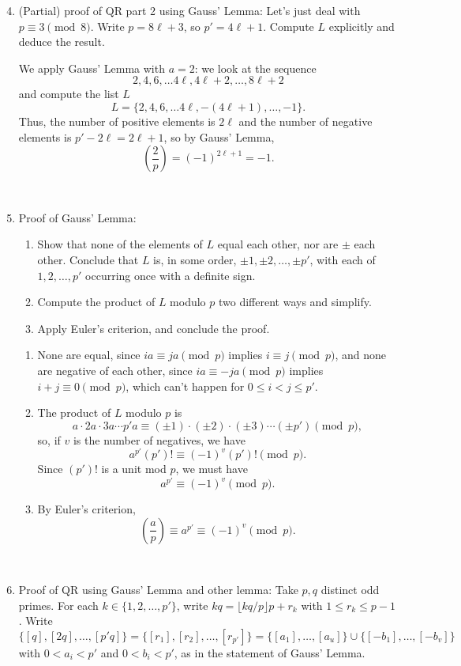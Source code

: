 \documentclass[12pt]{amsart}
\newcommand{\solution}[1]{\ifthenelse {\equal{\displaysol}{1}} {\begin{framed}{\color{meretale}\noindent #1}\end{framed}} { \ }}
\begin{document}
\begin{enumerate}\setcounter{enumi}{3}
\item (Partial) proof of QR part 2 using Gauss' Lemma: Let's just deal with $p\equiv 3 \pmod{8}$. Write $p=8\ell+3$, so $p'=4\ell+1$. Compute $L$ explicitly and deduce the result.

\solution{We apply Gauss' Lemma with $a=2$: we look at the sequence
\[ 2,4,6,\dots 4\ell, 4\ell+2, \dots, 8\ell+2\]
and compute  the list $L$
\[ L= \{2,4,6,\dots 4\ell, -(4\ell +1), \dots, -1\}.\]
Thus, the number of positive elements is $2\ell$ and the number of negative elements is $p' - 2\ell = 2\ell+1$, so by Gauss' Lemma,
\[ \left(\frac{2}{p} \right) = (-1)^{2\ell + 1} = -1.\]}


\item Proof of Gauss' Lemma:
\begin{enumerate}
\item Show that none of the elements of $L$ equal each other, nor are $\pm$ each other. Conclude that $L$ is, in some order, $\pm 1, \pm 2, \dots, \pm p'$, with each of $1,2, \dots, p'$ occurring once with a definite sign.
\item Compute the product of $L$ modulo $p$ two different ways and simplify.
\item Apply Euler's criterion, and conclude the proof.
\end{enumerate}

\solution{
\begin{enumerate}
\item None are equal, since $ia \equiv ja \pmod{p}$ implies $i \equiv j \pmod{p}$, and none are negative of each other, since $ia \equiv -ja \pmod{p}$ implies $i+j \equiv 0 \pmod{p}$, which can't happen for $0\leq i< j \leq p'$.
\item The product of $L$ modulo $p$ is
\[ a \cdot 2a \cdot 3a \cdots p'a \equiv (\pm 1) \cdot (\pm 2) \cdot (\pm 3) \cdots (\pm p') \pmod{p},\]
so, if $v$ is the number of negatives, we have
\[ a^{p'} (p')! \equiv (-1)^v (p')! \pmod{p}.\]
Since $(p')!$ is a unit mod $p$, we must have
\[ a^{p'} \equiv (-1)^v \pmod{p}.\]
\item By Euler's criterion, 
\[ \left(\frac{a}{p} \right) \equiv a^{p'} \equiv (-1)^v \pmod{p}.\]
\end{enumerate}
}

\item Proof of QR using Gauss' Lemma and other lemma:
Take $p,q$ distinct odd primes. For each $k\in\{ 1,2,\dots, p'\}$, write $kq = \lfloor kq/p \rfloor p + r_k$ with $1\leq r_k \leq p-1$. Write
\[ \{[q], [2q], \dots, [p' q]\} = \{ [r_1] , [r_2], \dots, [r_{p'}]\} = \{ [a_1] ,\dots, [a_u] \} \cup \{ [-b_1] , \dots,[-b_v]\}\]
with $0< a_i < p'$ and $0 < b_i < p'$, as in the statement of Gauss' Lemma.



\end{enumerate}
\end{document}
